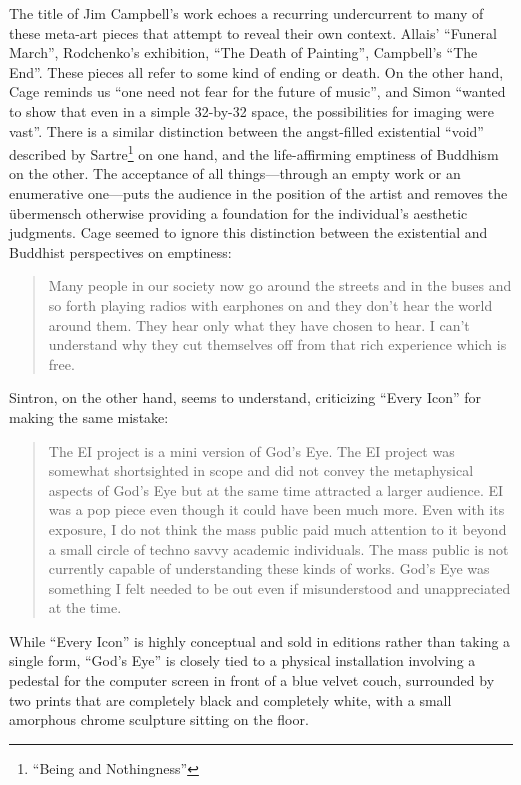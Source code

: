 \documentclass{thesis}
\begin{document}
The title of Jim Campbell's work echoes a recurring undercurrent to many of these meta-art pieces that attempt to reveal their own context. Allais' ``Funeral March'', Rodchenko's exhibition, ``The Death of Painting'', Campbell's ``The End''. These pieces all refer to some kind of ending or death. On the other hand, Cage reminds us ``one need not fear for the future of music'', and Simon ``wanted to show that even in a simple 32-by-32 space, the possibilities for imaging were vast''\cite{matthew_mirapaul_in_1997}. There is a similar distinction between the angst-filled existential ``void'' described by Sartre\footnote{``Being and Nothingness''} on one hand, and the life-affirming emptiness of Buddhism on the other. The acceptance of all things---through an empty work or an enumerative one---puts the audience in the position of the artist and removes the \"ubermensch otherwise providing a foundation for the individual's aesthetic judgments. Cage seemed to ignore this distinction between the existential and Buddhist perspectives on emptiness:
	
\begin{quote}
Many people in our society now go around the streets and in the buses and so forth playing radios with earphones on and they don't hear the world around them. They hear only what they have chosen to hear. I can't understand why they cut themselves off from that rich experience which is free.
\end{quote}

Sintron, on the other hand, seems to understand, criticizing ``Every Icon'' for making the same mistake\cite{olga_goriunova_and_alexei_shulgin_touching_2003}:

	\begin{quote}
	The EI project is a mini version of God's Eye. The EI project was somewhat shortsighted in scope and did not convey the metaphysical aspects of God's Eye but at the same time attracted a larger audience. EI was a pop piece even though it could have been much more. Even with its exposure, I do not think the mass public paid much attention to it beyond a small circle of techno savvy academic individuals. The mass public is not currently capable of understanding these kinds of works. God's Eye was something I felt needed to be out even if misunderstood and unappreciated at the time.
	\end{quote}
	
While ``Every Icon'' is highly conceptual and sold in editions rather than taking a single form, ``God's Eye'' is closely tied to a physical installation involving a pedestal for the computer screen in front of a blue velvet couch, surrounded by two prints that are completely black and completely white, with a small amorphous chrome sculpture sitting on the floor.
		
\end{document}

